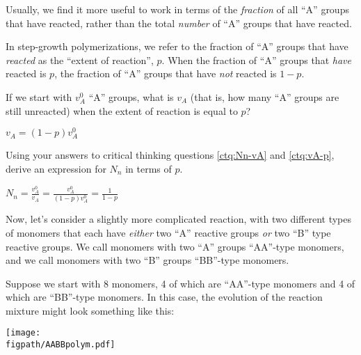 \begin{activity}
\begin{ctqs}
\end{ctqs}
	
\begin{infobox}

Usually, we find it more useful to work in terms of the \emph{fraction} of all ``A'' groups that have reacted, rather than the total \emph{number} of ``A'' groups that have reacted.

In step-growth polymerizations, we refer to the fraction of ``A'' groups that have \emph{reacted} as the ``extent of reaction'', $p$.
When the fraction of ``A'' groups that \emph{have} reacted is $p$, the fraction of ``A'' groups that have \emph{not} reacted is $1-p$.

\end{infobox}
	
\begin{ctqs}
		
		\question \label{ctq:vA-p} If we start with $v_A^0$ ``A'' groups, what is $v_A$ (that is, how many ``A'' groups are still unreacted) when the extent of reaction is equal to $p$?
		
		\begin{solution}[1in]
			$v_A = (1-p)v_A^0$
		\end{solution}
		
		\question Using your answers to critical thinking questions \ref{ctq:Nn-vA} and \ref{ctq:vA-p}, derive an expression for $N_n$ in terms of $p$.
		
		\begin{solution}[1in]
			$N_n = \frac{v_A^0}{v_A} = \frac{v_A^0}{(1-p)v_A^0} = \frac{1}{1-p}$
		\end{solution}
		
\end{ctqs}

\clearpage
\begin{model}

Now, let's consider a slightly more complicated reaction, with two different types of monomers that each have \emph{either} two ``A'' reactive groups \emph{or} two ``B'' type reactive groups.
We call monomers with two ``A'' groups ``AA''-type monomers, and we call monomers with two ``B'' groups ``BB''-type monomers.

Suppose we start with 8 monomers, 4 of which are ``AA''-type monomers and 4 of which are ``BB''-type monomers.
In this case, the evolution of the reaction mixture might look something like this:

\vspace{0.1in}
\centerline{\texttt{[image: \\figpath/AABBpolym.pdf]}}


\end{model}
\end{activity}
